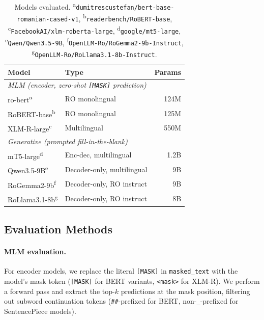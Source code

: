 \documentclass[11pt]{article}
\begin{document}
\begin{table}[t]
    \centering
    \small
    \begin{tabular}{llr}
        \toprule
        Model & Type & Params \\
        \midrule
        \multicolumn{3}{l}{\textit{MLM (encoder, zero-shot \texttt{[MASK]} prediction)}} \\
        ro-bert\textsuperscript{a} & RO monolingual & 124M \\
        RoBERT-base\textsuperscript{b} & RO monolingual & 125M \\
        XLM-R-large\textsuperscript{c} & Multilingual & 550M \\
        \midrule
        \multicolumn{3}{l}{\textit{Generative (prompted fill-in-the-blank)}} \\
        mT5-large\textsuperscript{d} & Enc-dec, multilingual & 1.2B \\
        Qwen3.5-9B\textsuperscript{e} & Decoder-only, multilingual & 9B \\
        RoGemma2-9b\textsuperscript{f} & Decoder-only, RO instruct & 9B \\
        RoLlama3.1-8b\textsuperscript{g} & Decoder-only, RO instruct & 8B \\
        \bottomrule
    \end{tabular}
    \caption{Models evaluated. \textsuperscript{a}\texttt{dumitrescustefan/bert-base-romanian-cased-v1}, \textsuperscript{b}\texttt{readerbench/RoBERT-base}, \textsuperscript{c}\texttt{FacebookAI/xlm-roberta-large}, \textsuperscript{d}\texttt{google/mt5-large}, \textsuperscript{e}\texttt{Qwen/Qwen3.5-9B}, \textsuperscript{f}\texttt{OpenLLM-Ro/RoGemma2-9b-Instruct}, \textsuperscript{g}\texttt{OpenLLM-Ro/RoLlama3.1-8b-Instruct}.}
    \label{tab:models}
\end{table}

\subsection{Evaluation Methods}

\paragraph{MLM evaluation.} For encoder models, we replace the literal \texttt{[MASK]} in \texttt{masked\_text} with the model's mask token (\texttt{[MASK]} for BERT variants, \texttt{<mask>} for XLM-R). We perform a forward pass and extract the top-$k$ predictions at the mask position, filtering out subword continuation tokens (\texttt{\#\#}-prefixed for BERT, non-\texttt{\_}-prefixed for SentencePiece models).
\end{document}
